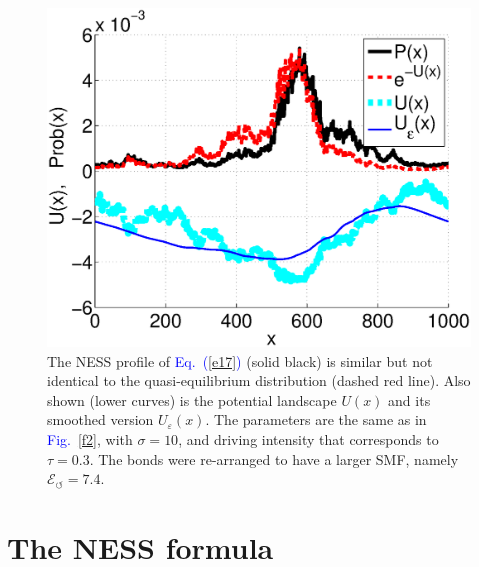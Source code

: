 \documentclass[aps,pre,floats,floatfix,twocolumn]{revtex4}
\newcommand{\Eq}[1]{\textcolor{blue}{Eq.\!\!~(\ref{#1})}}
\newcommand{\Fig}[1]{\textcolor{blue}{Fig.}\!\!~\ref{#1}}
\begin{document}
\begin{figure}
\includegraphics[width=\hsize]{PvsV4}

\caption{
The NESS profile of \Eq{e17} (solid black) 
is similar but not identical to the quasi-equilibrium 
distribution (dashed red line). 
Also shown (lower curves) is the potential landscape $U(x)$ 
and its smoothed version $U_{\varepsilon}(x)$. 
The parameters are the same as in \Fig{f2}, 
with $\sigma=10$, 
and driving intensity that corresponds to $\tau=0.3$.
The bonds were re-arranged to have a larger SMF,
namely $\mathcal{E}_{\circlearrowleft}=7.4$.}

\label{f3}
\end{figure}





\section{The NESS formula}
\label{sec:formula}
\end{document}
